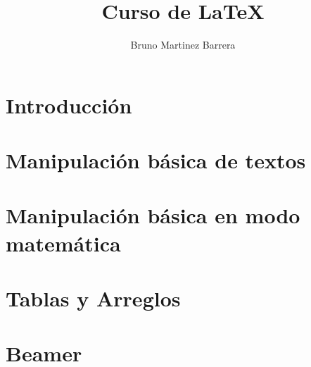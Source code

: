 \documentclass[letterpaper,12pt]{book}
\title{Curso de \LaTeX{}}
\author{Bruno Martinez Barrera}
\begin{document}
    
\maketitle
\tableofcontents
	
\chapter{Introducción}
	
    
    
\chapter{Manipulación básica de textos}
    
    
    
\chapter{Manipulación básica en modo matemática}
    
    
    
\chapter{Tablas y Arreglos}

    
    
\chapter{Beamer}

    
    

%    
    
\end{document}
